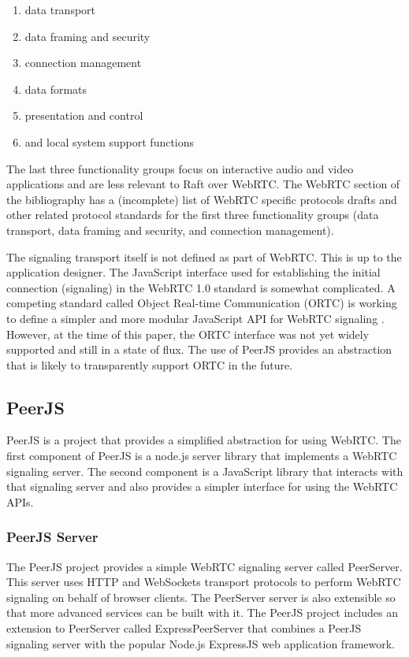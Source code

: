 \documentclass[9pt]{extarticle}
\begin{document}
\begin{multicols}{2}
\begin{enumerate}
    \item data transport
    \item data framing and security
    \item connection management
    \item data formats
    \item presentation and control
    \item and local system support functions
\end{enumerate}

The last three functionality groups focus on interactive audio and video
applications and are less relevant to Raft over WebRTC. The WebRTC
section of the bibliography %
has a (incomplete) list of WebRTC specific protocols drafts and other
related protocol standards for the first three functionality groups
(data transport, data framing and security, and connection
management).

The signaling transport itself is not defined as part of WebRTC.
This is up to the application designer. The JavaScript interface used
for establishing the initial connection (signaling) in the WebRTC 1.0
standard is somewhat complicated. A competing standard called Object
Real-time Communication (ORTC) is working to define a simpler and more
modular JavaScript API for WebRTC signaling \cite{ortc2014}. However,
at the time of this paper, the ORTC interface was not yet widely
supported and still in a state of flux. The use of PeerJS provides an
abstraction that is likely to transparently support ORTC in the future.

\subsection{PeerJS}

PeerJS is a project that provides a simplified abstraction for using
WebRTC. The first component of PeerJS is a node.js server library that
implements a WebRTC signaling server. The second component is
a JavaScript library that interacts with that signaling server and
also provides a simpler interface for using the WebRTC APIs.

\subsubsection{PeerJS Server}

The PeerJS project provides a simple WebRTC signaling server called
PeerServer. This server uses HTTP and WebSockets transport protocols
to perform WebRTC signaling on behalf of browser clients. The
PeerServer server is also extensible so that more advanced services
can be built with it. The PeerJS project includes an extension to
PeerServer called ExpressPeerServer that combines a PeerJS signaling
server with the popular Node.js ExpressJS web application framework.


\end{multicols}
\end{document}
